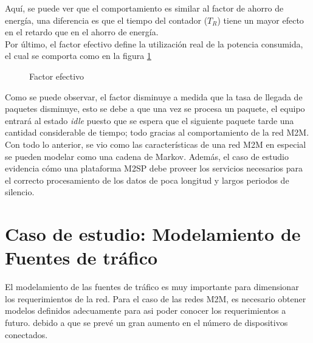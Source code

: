 \documentclass[journal]{IEEEtran}
\begin{document}
Aquí, se puede ver que el comportamiento es similar al factor de ahorro de energía, una diferencia es que el tiempo del contador ($T_{R}$) tiene un mayor efecto en el retardo que en el ahorro de energía.\\

Por último, el factor efectivo define la utilización real de la potencia consumida, el cual se comporta como en la figura \ref{efectivo}

\begin{figure}[h]
\centering
{}
\caption{Factor efectivo}
\label{efectivo}
\end{figure}

Como se puede observar, el factor disminuye a medida que la tasa de llegada de paquetes disminuye, esto se debe a que una vez se procesa un paquete, el equipo entrará al estado \textit{idle} puesto que se espera que el siguiente paquete tarde una cantidad considerable de tiempo; todo gracias al comportamiento de la red M2M.\\

Con todo lo anterior, se vio como las características de una red M2M en especial se pueden modelar como una cadena de Markov. Además, el caso de estudio evidencia cómo una plataforma M2SP debe proveer los servicios necesarios para el correcto procesamiento de los datos de poca longitud y largos periodos de silencio.

\section{Caso de estudio: Modelamiento de Fuentes de tráfico}

El modelamiento de las fuentes de tráfico es muy importante para dimensionar los requerimientos de la red. Para el caso de las redes M2M, es necesario obtener modelos definidos adecuamente para asi poder conocer los requerimientos a futuro. debido a que se prevé un gran aumento en el número de dispositivos conectados.\\
\end{document}
